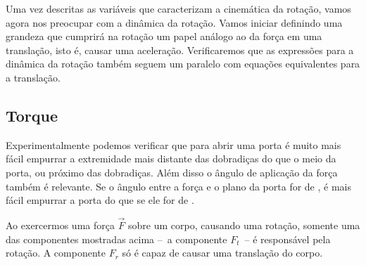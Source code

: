 Uma vez descritas as variáveis que caracterizam a cinemática da rotação, vamos agora nos preocupar com a dinâmica da rotação. Vamos iniciar definindo uma grandeza que cumprirá na rotação um papel análogo ao da força em uma translação, isto é, causar uma aceleração. Verificaremos que as expressões para a dinâmica da rotação também seguem um paralelo com equações equivalentes para a translação.

\subsection{Torque}

Experimentalmente podemos verificar que para abrir uma porta é muito mais fácil empurrar a extremidade mais distante das dobradiças do que o meio da porta, ou próximo das dobradiças. Além disso o ângulo de aplicação da força também é relevante. Se o ângulo entre a força e o plano da porta for de , é mais fácil empurrar a porta do que se ele for de .

\begin{marginfigure}[-2cm]
\centering
{}
\caption{Ao exercermos uma força $\vec{F}$ sobre um corpo, causando uma rotação, somente uma das componentes mostradas acima --~a componente $F_t$~-- é responsável pela rotação. A componente $F_r$ só é capaz de causar uma translação do corpo. \label{Fig:DefinicaoTorque}}
\end{marginfigure}

